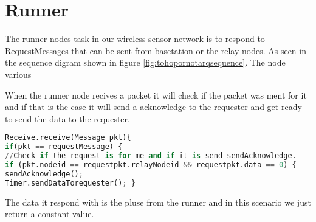 \section{Runner}\label{sc:runner}
The runner nodes task in our wireless sensor network is to respond to RequestMessages that can be sent from basetation or the relay nodes. As seen in the sequence digram shown in figure \ref{fig:tohopornotarqsequence}. The node various 

When the runner node recives a packet it will check if the packet was ment for it and if that is the case it will send a acknowledge to the requester and get ready to send the data to the requester.
\begin{lstlisting}[language=Python]
Receive.receive(Message pkt){
if(pkt == requestMessage) {
//Check if the request is for me and if it is send sendAcknowledge.
if (pkt.nodeid == requestpkt.relayNodeid && requestpkt.data == 0) {
sendAcknowledge();
Timer.sendDataTorequester(); }
\end{lstlisting}
The data it respond with is the pluse from the runner and in this scenario we just return a constant value.